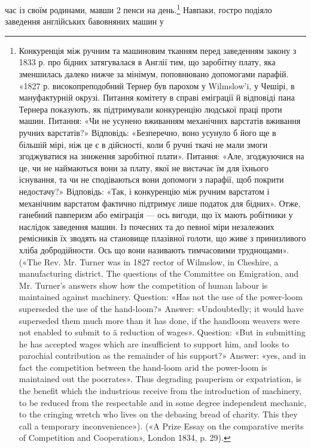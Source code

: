 час із своїм родинами, мавши 2 пенси на день.\footnote{
Конкуренція між ручним та машиновим тканням перед заведенням
закону з 1833 р. про бідних затягувалася в Англії тим, що заробітну
плату, яка зменшилась далеко нижче за мінімум, поповнювано
допомогами парафій. «1827 р. високопреподобний Тернер був парохом у
Wilmslow’i, у Чешірі, в мануфактурній окрузі. Питання комітету в справі
еміграції й відповіді пана Тернера показують, як підтримували конкуренцію
людської праці проти машин. Питання: «Чи не усунено вживанням
механічних варстатів вживання ручних варстатів?» Відповідь: «Безперечно,
воно усунуло б його ще в більшій мірі, ніж це є в дійсності, коли б
ручні ткачі не мали змоги згоджуватися на зниження заробітної плати».
Питання: «Але, згоджуючися на це, чи не наймаються вони за плату,
якої не вистачає їм для їхнього існування, та чи не сподіваються вони
допомоги з парафії, щоб покрити недостачу?» Відповідь: «Так, і конкуренцію
між ручним варстатом і механічним варстатом фактично підтримує
лише податок для бідних». Отже, ганебний павперизм або еміграція — ось
вигоди, що їх мають робітники у наслідок заведення машин. Із почесних
та до певної міри незалежних ремісників їх зводять на становище плазівної
голоти, що живе з принизливого хліба добродійности. Ось що
вони називають тимчасовими труднощами». («The Rev. Mr. Turner was
in 1827 rector of Wilmslow, in Cheshire, a manufacturing district. The questions
of the Committee on Emigration, and Mr. Turner’s answers show
how the competition of human labour is maintained against machinery.
Question: «Has not the use of the power-loom superseded the use of the
hand-loom?» Answer: «Undoubtedly; it would have superseded them much
more than it has done, if the handloom weavers were not enabled to submit
to ä reduction of wages». Question: «But in submitting he has accepted wages
which are insufficient to support him, and looks to parochial contribution
as the remainder of his support?» Answer: «yes, and in fact the competition
between the hand-loom arid the power-loom is maintained out the poorrates».
Thus degrading pauperism or expatriation, is the benefit which the
industrious receive from the introduction of machinery, to be reduced from
the respectable and in some degree independent mechanic, to the cringing
wretch who lives on the debasing bread of charity. This they call a temporary
inconvenience»). («A Prize Essay on the comparative merits of Competition
and Cooperation», London 1834, p. 29).
} Навпаки, гостро подіяло заведення англійських бавовняних машин у

